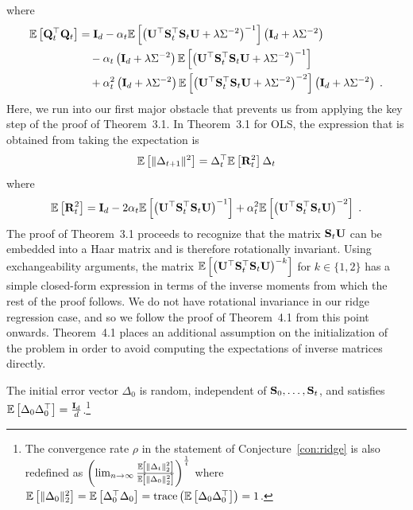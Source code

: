 where
\begin{align*}
\mathbb{E}\left[\mathbf{Q}_t^\top\mathbf{Q}_t\right] &= \mathbf{I}_d - \alpha_t\mathbb{E}\left[\left(\mathbf{U}^\top\mathbf{S}_t^\top\mathbf{S}_t\mathbf{U} + \lambda\Sigma^{-2}\right)^{-1}\right]\left(\mathbf{I}_d + \lambda\Sigma^{-2}\right) \\
&\quad - \alpha_t\left(\mathbf{I}_d + \lambda\Sigma^{-2}\right)\mathbb{E}\left[\left(\mathbf{U}^\top\mathbf{S}_t^\top\mathbf{S}_t\mathbf{U} + \lambda\Sigma^{-2}\right)^{-1}\right] \\
&\quad + \alpha_t^2\left(\mathbf{I}_d + \lambda\Sigma^{-2}\right)\mathbb{E}\left[\left(\mathbf{U}^\top\mathbf{S}_t^\top\mathbf{S}_t\mathbf{U} + \lambda\Sigma^{-2}\right)^{-2}\right]\left(\mathbf{I}_d + \lambda\Sigma^{-2}\right) \;.
\end{align*}
Here, we run into our first major obstacle that prevents us from applying the key step of the proof of Theorem~3.1. In Theorem~3.1 for OLS, the expression that is obtained from taking the expectation is
\[
\mathbb{E}\left[\|\Delta_{t+1}\|^2\right] = \Delta_t^\top\mathbb{E}\left[\mathbf{R}_t^2\right]\Delta_t
\]
where
\[
\mathbb{E}\left[\mathbf{R}_t^2\right] = \mathbf{I}_d - 2\alpha_t\mathbb{E}\left[\left(\mathbf{U}^\top\mathbf{S}_t^\top\mathbf{S}_t\mathbf{U}\right)^{-1}\right] + \alpha_t^2\mathbb{E}\left[\left(\mathbf{U}^\top\mathbf{S}_t^\top\mathbf{S}_t\mathbf{U}\right)^{-2}\right] \;.
\]
The proof of Theorem~3.1 proceeds to recognize that the matrix $\mathbf{S}_t\mathbf{U}$ can be embedded into a Haar matrix and is therefore rotationally invariant. Using exchangeability arguments, the matrix $\mathbb{E}\left[\left(\mathbf{U}^\top\mathbf{S}_t^\top\mathbf{S}_t\mathbf{U}\right)^{-k}\right]$ for $k\in\{1,2\}$ has a simple closed-form expression in terms of the inverse moments from which the rest of the proof follows. We do not have rotational invariance in our ridge regression case, and so we follow the proof of Theorem~4.1 from this point onwards. Theorem~4.1 places an additional assumption on the initialization of the problem in order to avoid computing the expectations of inverse matrices directly.

\begin{assumption} \label{asp:initialization}
The initial error vector $\Delta_0$ is random, independent of $\mathbf{S}_0,\ldots,\mathbf{S}_t$, and satisfies $\mathbb{E}\left[\Delta_0\Delta_0^\top\right]=\frac{\mathbf{I}_d}{d}$.\footnote{The convergence rate $\rho$ in the statement of Conjecture~\ref{con:ridge} is also redefined as $\left(\lim_{n\rightarrow\infty}\frac{\mathbb{E}\left[\|\Delta_t\|_2^2\right]}{\mathbb{E}\left[\|\Delta_0\|_2^2\right]}\right)^\frac{1}{t}$ where $\mathbb{E}\left[\|\Delta_0\|_2^2\right]=\mathbb{E}\left[\Delta_0^\top\Delta_0\right]=\mathrm{trace}\left(\mathbb{E}\left[\Delta_0\Delta_0^\top\right]\right)=1$.}
\end{assumption}


